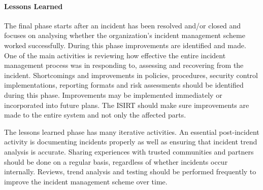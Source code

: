 \paragraph{Lessons Learned} The final phase starts after an incident has been resolved and/or closed and focuses on analysing whether the organization's incident management scheme worked successfully. During this phase improvements are identified and made. One of the main activities is reviewing how effective the entire incident management process was in responding to, assessing and recovering from the incident. Shortcomings and improvements in policies, procedures, security control implementations, reporting formats and risk assessments should be identified during this phase. Improvements may be implemented immediately or incorporated into future plans. The \ac{ISIRT} should make sure improvements are made to the entire system and not only the affected parts.

The lessons learned phase has many iterative activities. An essential post-incident activity is documenting incidents properly as well as ensuring that incident trend analysis is accurate. Sharing experiences with trusted communities and partners should be done on a regular basis, regardless of whether incidents occur internally. Reviews, trend analysis and testing should be performed frequently to improve the incident management scheme over time. 




